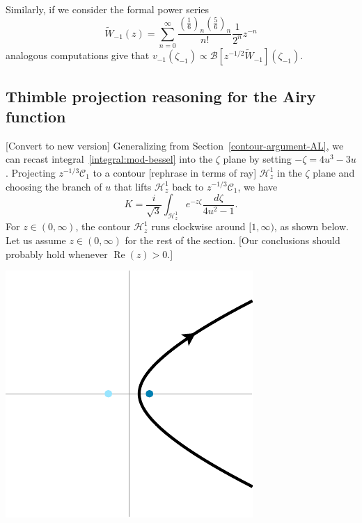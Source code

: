 \documentclass{article}
\newcommand{\borel}{\mathcal{B}}
\theoremstyle{definition}
\theoremstyle{plain}
\newenvironment{todo}{\color{Coral}}{\color{black}}
\newenvironment{old}{\color{RoyalBlue}}{\color{black}}
\begin{document}
\begin{old}
Similarly, if we consider the formal power series
\begin{equation}
\tilde{W}_{-1}(z)=\sum_{n=0}^{\infty}\frac{\left(\frac{1}{6}\right)_n\left(\frac{5}{6}\right)_n}{n!}\frac{1}{2^n}z^{-n}
\end{equation}
analogous computations give that $v_{-1}(\zeta_{-1})\propto\borel\left[z^{-1/2}\tilde{W}_{-1}\right](\zeta_{-1})$.
\subsection{Thimble projection reasoning for the Airy function}\label{contour-argument}
\begin{todo}[Convert to new version]\end{todo} Generalizing from Section~\ref{contour-argument-AL}, we can recast integral~\eqref{integral:mod-bessel} into the $\zeta$ plane by setting $-\zeta = 4u^3 - 3u$. Projecting $z^{-1/3} \mathcal{C}_1$ to a contour \begin{todo}[rephrase in terms of ray]\end{todo} $\mathcal{H}^1_z$ in the $\zeta$ plane and choosing the branch of $u$ that lifts $\mathcal{H}^1_z$ back to $z^{-1/3} \mathcal{C}_1$, we have
\begin{equation}\label{integral:mod-bessel-zeta}
K = \frac{i}{\sqrt{3}} \int_{\mathcal{H}^1_z} e^{-z\zeta}\frac{d\zeta}{4u^2 - 1}.
\end{equation}
For $z \in (0, \infty)$, the contour $\mathcal{H}^1_z$ runs clockwise around $[1, \infty)$, as shown below. Let us assume $z \in (0, \infty)$ for the rest of the section. \begin{todo}[Our conclusions should probably hold whenever $\operatorname{Re}(z) > 0$.]\end{todo}
\begin{center}
\includegraphics{figures/zeta_contour_3.pdf} \\[1em]

\end{center}
\end{old}
\end{document}
